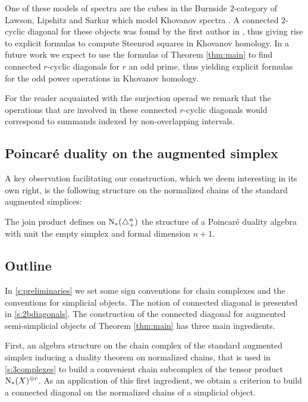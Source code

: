 One of these models of spectra are the cubes in the Burnside $2$-category of Lawson, Lipshitz and Sarkar \cite{LLS20} which model Khovanov spectra \cite{LS14}. A connected $2$-cyclic diagonal for these objects was found by the first author in \cite{cantero-moran2020khovanov}, thus giving rise to explicit formulas to compute Steenrod squares in Khovanov homology. In a future work we expect to use the formulas of Theorem \ref{thm:main} to find connected $r$-cyclic diagonals for $r$ an odd prime, thus yielding explicit formulas for the odd power operations in Khovanov homology.

For the reader acquainted with the surjection operad we remark that the operations that are involved in these connected $r$-cyclic diagonals would correspond to summands indexed by non-overlapping intervals.

\subsection{Poincar\'e duality on the augmented simplex}

A key observation facilitating our construction, which we deem interesting in its own right, is the following structure on the normalized chains of the standard augmented simplices:

\begin{theorem}
	The join product defines on $\operatorname{N}_{*}(\triangle_{+}^{n})$ the structure of a Poincar\'e duality algebra with unit the empty simplex and formal dimension $n+1$.
\end{theorem}

\subsection{Outline}

In \cref{s:preliminaries} we set some sign conventions for chain complexes and the conventions for simplicial objects.
The notion of connected diagonal is presented in \cref{s:2bdiagonals}.
The construction of the connected diagonal for augmented semi-simplicial objects of Theorem \ref{thm:main} has three main ingredients.


First, an algebra structure on the chain complex of the standard augmented simplex inducing a duality theorem on normalized chains, that is used in \cref{s:3complexes} to build a convenient chain subcomplex of the tensor product $\operatorname{N}_{*}(X)^{\otimes r}$.
As an application of this first ingredient, we obtain a criterion to build a connected diagonal on the normalized chains of a simplicial object.


